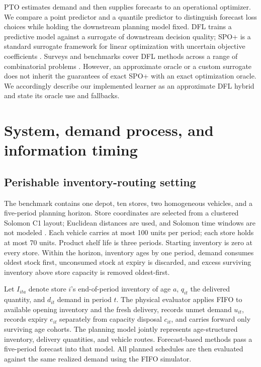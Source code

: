 \documentclass[11pt,a4paper]{article}
\begin{document}
PTO estimates demand and then supplies forecasts to an operational optimizer. We compare a point predictor and a quantile predictor to distinguish forecast loss choices while holding the downstream planning model fixed. DFL trains a predictive model against a surrogate of downstream decision quality; SPO+ is a standard surrogate framework for linear optimization with uncertain objective coefficients \citep{elmachtoub2022smart}. Surveys and benchmarks cover DFL methods across a range of combinatorial problems \citep{mandi2024decision}. However, an approximate oracle or a custom surrogate does not inherit the guarantees of exact SPO+ with an exact optimization oracle. We accordingly describe our implemented learner as an approximate DFL hybrid and state its oracle use and fallbacks.

\section{System, demand process, and information timing}

\subsection{Perishable inventory-routing setting}

The benchmark contains one depot, ten stores, two homogeneous vehicles, and a five-period planning horizon. Store coordinates are selected from a clustered Solomon C1 layout; Euclidean distances are used, and Solomon time windows are not modeled \citep{solomon1987algorithms}. Each vehicle carries at most 100 units per period; each store holds at most 70 units. Product shelf life is three periods. Starting inventory is zero at every store. Within the horizon, inventory ages by one period, demand consumes oldest stock first, unconsumed stock at expiry is discarded, and excess surviving inventory above store capacity is removed oldest-first.

Let $I_{ita}$ denote store $i$'s end-of-period inventory of age $a$, $q_{it}$ the delivered quantity, and $d_{it}$ demand in period $t$. The physical evaluator applies FIFO to available opening inventory and the fresh delivery, records unmet demand $u_{it}$, records expiry $e_{it}$ separately from capacity disposal $c_{it}$, and carries forward only surviving age cohorts. The planning model jointly represents age-structured inventory, delivery quantities, and vehicle routes. Forecast-based methods pass a five-period forecast into that model. All planned schedules are then evaluated against the same realized demand using the FIFO simulator.
\end{document}
